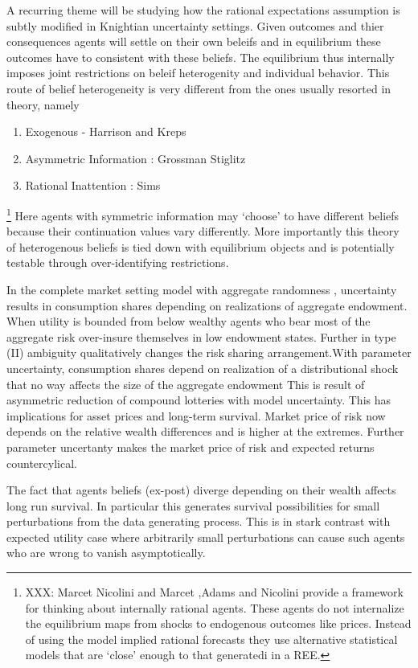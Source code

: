 \documentclass[12pt]{article}
\begin{document}
\noindent A recurring theme will be studying how the rational expectations assumption is subtly modified in Knightian uncertainty settings. Given outcomes and thier consequences agents will settle on their own beleifs and in equilibrium these outcomes have to consistent with these beliefs. The equilibrium thus internally imposes joint restrictions on beleif heterogenity and individual behavior. This route of belief heterogeneity is very different from the ones usually resorted in theory, namely
\begin{enumerate}
	\item Exogenous  - Harrison and Kreps
	\item Asymmetric Information : Grossman Stiglitz
	\item Rational Inattention  : Sims
\end{enumerate}

\footnote{XXX: Marcet Nicolini and Marcet ,Adams and Nicolini provide a framework for thinking about internally rational agents. These agents do not internalize the equilibrium maps from shocks to endogenous outcomes like prices. Instead of using the model implied rational forecasts they use alternative statistical models that are `close' enough to that generatedi  in a REE.  }
\noindent Here agents with symmetric information may `choose' to have different beliefs because their continuation values vary differently. More importantly this theory of heterogenous beliefs is tied down with equilibrium objects and is potentially testable through over-identifying restrictions.


\noindent In the complete market setting model with aggregate randomness , uncertainty results in consumption shares depending on realizations of aggregate endowment. When utility is bounded from below wealthy agents who bear most of the aggregate risk over-insure themselves in low endowment states. Further in type (II) ambiguity qualitatively changes the risk sharing arrangement.With parameter uncertainty, consumption shares depend on realization of a distributional shock that no way affects the size of the aggregate endowment This is result of asymmetric reduction of compound lotteries with model uncertainty. This has implications for asset prices and long-term survival. Market price of risk now depends on the relative wealth differences and is higher at the extremes. Further parameter uncertanty makes the market price of risk and expected returns countercylical.

The fact that agents beliefs (ex-post) diverge depending on their wealth affects long run survival. In particular this generates survival possibilities for small perturbations from the data generating process. This is in stark contrast with expected utility case where arbitrarily small perturbations can cause such agents who are wrong to vanish asymptotically. 
\end{document}
